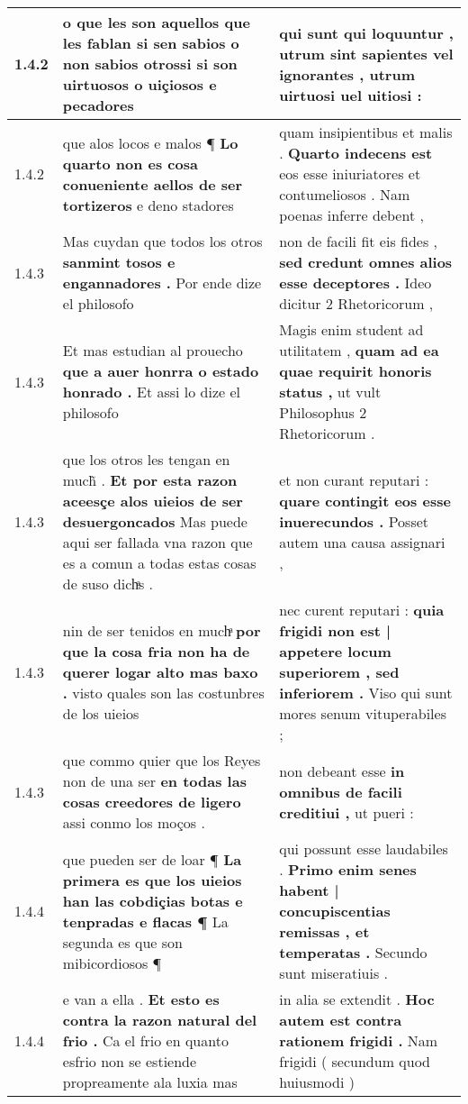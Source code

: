 \begin{tabular}{|p{1cm}|p{6.5cm}|p{6.5cm}|}
1.4.2 & o que les son aquellos que les fablan \textbf{ si sen sabios o non sabios } otrossi si son uirtuosos o uiçiosos e pecadores & qui sunt qui loquuntur , \textbf{ utrum sint sapientes vel ignorantes , } utrum uirtuosi uel uitiosi : \\\hline
1.4.2 & que alos locos e malos ¶ \textbf{ Lo quarto non es cosa conueniente aellos de ser tortizeros } e deno stadores & quam insipientibus et malis . \textbf{ Quarto indecens est } eos esse iniuriatores et contumeliosos . Nam poenas inferre debent , \\\hline
1.4.3 & Mas cuydan que todos los otros \textbf{ sanmint tosos e engannadores . } Por ende dize el philosofo & non de facili fit eis fides , \textbf{ sed credunt omnes alios esse deceptores . } Ideo dicitur 2 Rhetoricorum , \\\hline
1.4.3 & Et mas estudian al prouecho \textbf{ que a auer honrra o estado honrado . } Et assi lo dize el philosofo & Magis enim student ad utilitatem , \textbf{ quam ad ea quae requirit honoris status , } ut vult Philosophus 2 Rhetoricorum . \\\hline
1.4.3 & que los otros les tengan en much̃ . \textbf{ Et por esta razon aceesçe alos uieios de ser desuergoncados } Mas puede aqui ser fallada vna razon que es a comun a todas estas cosas de suso dichͣs . & et non curant reputari : \textbf{ quare contingit eos esse inuerecundos . } Posset autem una causa assignari , \\\hline
1.4.3 & nin de ser tenidos en muchͣ \textbf{ por que la cosa fria non ha de querer logar alto mas baxo . } visto quales son las costunbres de los uieios & nec curent reputari : \textbf{ quia frigidi non est | appetere locum superiorem , sed inferiorem . } Viso qui sunt mores senum vituperabiles ; \\\hline
1.4.3 & que commo quier que los Reyes non de una ser \textbf{ en todas las cosas creedores de ligero } assi conmo los moços . & non debeant esse \textbf{ in omnibus de facili creditiui , } ut pueri : \\\hline
1.4.4 & que pueden ser de loar ¶ \textbf{ La primera es que los uieios han las cobdiçias botas e tenpradas e flacas ¶ } La segunda es que son mibicordiosos ¶ & qui possunt esse laudabiles . \textbf{ Primo enim senes habent | concupiscentias remissas , et temperatas . } Secundo sunt miseratiuis . \\\hline
1.4.4 & e van a ella . \textbf{ Et esto es contra la razon natural del frio . } Ca el frio en quanto esfrio non se estiende propreamente ala luxia mas & in alia se extendit . \textbf{ Hoc autem est contra rationem frigidi . } Nam frigidi ( secundum quod huiusmodi ) \\\hline

\end{tabular}

